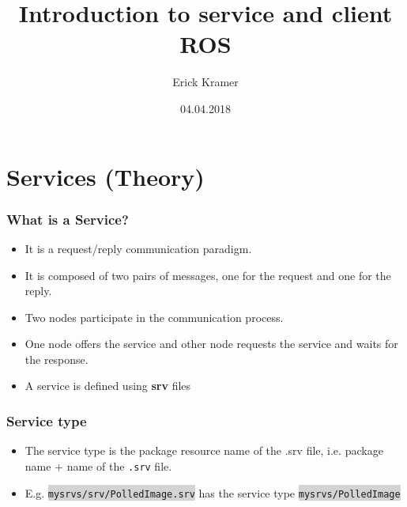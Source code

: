 \documentclass{beamer}
\author[Kramer]{Erick Kramer}
\title{Introduction to service and client ROS}
\subtitle{}
\institute[HBRS]{Hochschule Bonn-Rhein-Sieg}
\date{04.04.2018}
\begin{document}
	{
		\begin{frame}
			\titlepage
		\end{frame}
	}
	
	\AtBeginSection[]{%
		\begin{frame}<beamer>
			\tableofcontents[currentsection]
		\end{frame}%
	}%
	
	\section{Services (Theory)}
	\begin{frame}
		\frametitle{What is a Service?}
		\begin{itemize}
			\item{It is a request/reply communication paradigm.}
			\item{It is composed of two pairs of messages, one for the request and one for the reply.}
			\item{Two nodes participate in the communication process.}
			\item{One node offers the service and other node requests the service and waits for the response.}
			\item{A service is defined using \textbf{srv} files}
			
		\end{itemize}
	\end{frame}
	\begin{frame}
		\frametitle{Service type}
		\begin{itemize}
			\item{The service type is the package resource name of the .srv file, i.e. package name + name of the \texttt{.srv} file.}
			\item{E.g. \colorbox{lightgray}{\texttt{mysrvs/srv/PolledImage.srv}} has the service type \colorbox{lightgray}{\texttt{mysrvs/PolledImage}} }
		\end{itemize}
	\end{frame}
\end{document}
